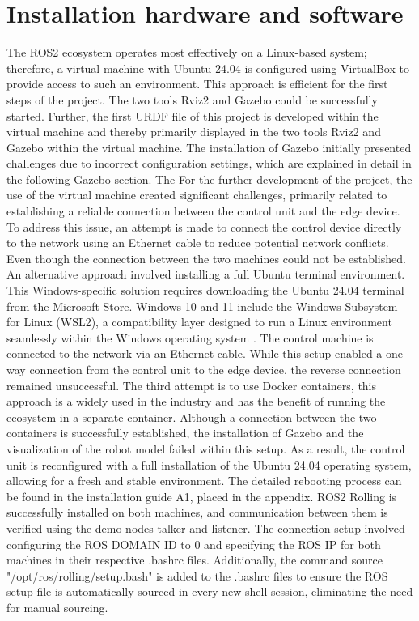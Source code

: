 \section{Installation hardware and software}


The ROS2 ecosystem operates most effectively on a Linux-based system; therefore, a virtual machine with Ubuntu 24.04 is configured using VirtualBox to provide access to such an environment. This approach is efficient for the first steps of the project. The two tools Rviz2 and Gazebo could be successfully started. Further, the first URDF file of this project is developed within the virtual machine and thereby primarily displayed in the two tools Rviz2 and Gazebo within the virtual machine. The installation of Gazebo initially presented challenges due to incorrect configuration settings, which are explained in detail in the following Gazebo section.
The For the further development of the project, the use of the virtual machine created significant challenges, primarily related to establishing a reliable connection between the control unit and the edge device. To address this issue, an attempt is made to connect the control device directly to the network using an Ethernet cable to reduce potential network conflicts. Even though the connection between the two machines could not be established.
An alternative approach involved installing a full Ubuntu terminal environment. This Windows-specific solution requires downloading the Ubuntu 24.04 terminal from the Microsoft Store. Windows 10 and 11 include the Windows Subsystem for Linux (WSL2), a compatibility layer designed to run a Linux environment seamlessly within the Windows operating system \autocite{microsoftWasIstWindowsSubsystem2023}.
The control machine is connected to the network via an Ethernet cable. While this setup enabled a one-way connection from the control unit to the edge device, the reverse connection remained unsuccessful.
The third attempt is to use Docker containers, this approach is a widely used in the industry and has the benefit of running the ecosystem in a separate container. Although a connection between the two containers is successfully established, the installation of Gazebo and the visualization of the robot model failed within this setup.
As a result, the control unit is reconfigured with a full installation of the Ubuntu 24.04 operating system, allowing for a fresh and stable environment.  The detailed rebooting process can be found in the installation guide A1, placed in the appendix. 
ROS2 Rolling is successfully installed on both machines, and communication between them is verified using the demo nodes talker and listener. The connection setup involved configuring the ROS DOMAIN ID to 0 and specifying the ROS IP for both machines in their respective .bashrc files. Additionally, the command source "/opt/ros/rolling/setup.bash" is added to the .bashrc files to ensure the ROS setup file is automatically sourced in every new shell session, eliminating the need for manual sourcing.

